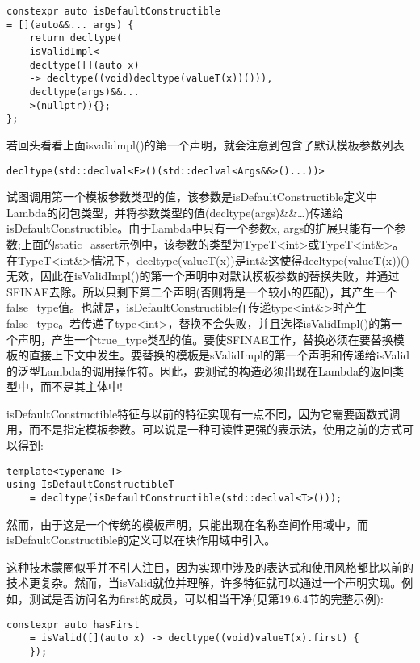 \begin{lstlisting}[style=styleCXX]
constexpr auto isDefaultConstructible
= [](auto&&... args) {
	return decltype(
	isValidImpl<
	decltype([](auto x)
	-> decltype((void)decltype(valueT(x))())),
	decltype(args)&&...
	>(nullptr)){};
};
\end{lstlisting}

若回头看看上面isvalidmpl()的第一个声明，就会注意到包含了默认模板参数列表

\begin{lstlisting}[style=styleCXX]
decltype(std::declval<F>()(std::declval<Args&&>()...))>
\end{lstlisting}

试图调用第一个模板参数类型的值，该参数是isDefaultConstructible定义中Lambda的闭包类型，并将参数类型的值(decltype(args)\&\&…)传递给isDefaultConstructible。由于Lambda中只有一个参数x, args的扩展只能有一个参数;上面的static\_assert示例中，该参数的类型为TypeT<int>或TypeT<int\&>。在TypeT<int\&>情况下，decltype(valueT(x))是int\&这使得decltype(valueT(x))()无效，因此在isValidImpl()的第一个声明中对默认模板参数的替换失败，并通过SFINAE去除。所以只剩下第二个声明(否则将是一个较小的匹配)，其产生一个false\_type值。也就是，isDefaultConstructible在传递type<int\&>时产生false\_type。若传递了type<int>，替换不会失败，并且选择isValidImpl()的第一个声明，产生一个true\_type类型的值。要使SFINAE工作，替换必须在要替换模板的直接上下文中发生。要替换的模板是sValidImpl的第一个声明和传递给isValid的泛型Lambda的调用操作符。因此，要测试的构造必须出现在Lambda的返回类型中，而不是其主体中!

isDefaultConstructible特征与以前的特征实现有一点不同，因为它需要函数式调用，而不是指定模板参数。可以说是一种可读性更强的表示法，使用之前的方式可以得到:

\begin{lstlisting}[style=styleCXX]
template<typename T>
using IsDefaultConstructibleT
	= decltype(isDefaultConstructible(std::declval<T>()));
\end{lstlisting}

然而，由于这是一个传统的模板声明，只能出现在名称空间作用域中，而isDefaultConstructible的定义可以在块作用域中引入。

这种技术蒙圈似乎并不引人注目，因为实现中涉及的表达式和使用风格都比以前的技术更复杂。然而，当isValid就位并理解，许多特征就可以通过一个声明实现。例如，测试是否访问名为first的成员，可以相当干净(见第19.6.4节的完整示例):

\begin{lstlisting}[style=styleCXX]
constexpr auto hasFirst
	= isValid([](auto x) -> decltype((void)valueT(x).first) {
	});
\end{lstlisting}

